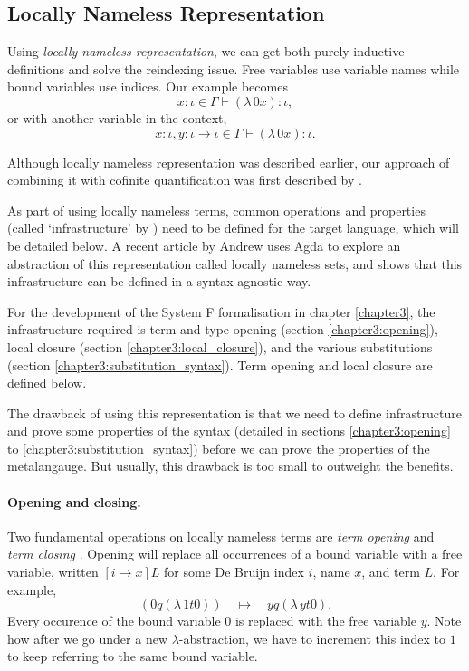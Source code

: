 \subsection{Locally Nameless Representation}
\label{section:background_locally_nameless}
Using \textit{locally nameless representation}, we can get both purely inductive definitions and
solve the reindexing issue. Free variables use variable names while bound variables use indices. Our
example becomes
\begin{equation*}
  x \colon \iota \in \Gamma \vdash (\lambda \, 0 x) \colon \iota,
\end{equation*}
or with another variable in the context,
\begin{equation*}
  x \colon \iota, y \colon \iota \to \iota \in \Gamma \vdash (\lambda \, 0 x) \colon \iota.
\end{equation*}

Although locally nameless representation was described earlier, our approach of combining it with
cofinite quantification was first described by \citet{aydemir_engineering_2008}.

As part of using locally nameless terms, common operations and properties (called `infrastructure'
by \citet{aydemir_engineering_2008}) need to be defined for the target language, which will be
detailed below. A recent article by Andrew \citet{pitts_locally_2023} uses Agda to explore an
abstraction of this representation called locally nameless sets, and shows that this infrastructure
can be defined in a syntax-agnostic way.

For the development of the System F formalisation in chapter \ref{chapter3}, the infrastructure
required is term and type opening (section \ref{chapter3:opening}), local closure (section
\ref{chapter3:local_closure}), and the various substitutions (section
\ref{chapter3:substitution_syntax}). Term opening and local closure are defined below.

The drawback of using this representation is that we need to define infrastructure and prove some
properties of the syntax (detailed in sections \ref{chapter3:opening} to
\ref{chapter3:substitution_syntax}) before we can prove the properties of the metalangauge. But
usually, this drawback is too small to outweight the benefits.

\paragraph*{Opening and closing.} Two fundamental operations on locally nameless terms are
\textit{term opening} and \textit{term closing} \citep{pitts_locally_2023}. Opening will replace all
occurrences of a bound variable with a free variable, written $[i \to x] L$ for some De Bruijn
index $i$, name $x$, and term $L$. For example,
\begin{equation*}
  [0 \to y] (0 q (\lambda \, 1 t 0)) \quad \mapsto \quad y q (\lambda \, y t 0).
\end{equation*}
Every occurence of the bound variable $0$ is replaced with the free variable $y$. Note how after we
go under a new $\lambda$-abstraction, we have to increment this index to $1$ to keep referring to
the same bound variable.


